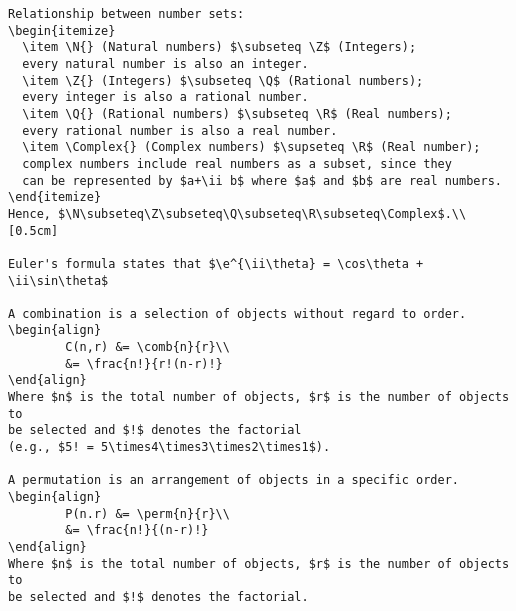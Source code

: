 \documentclass[a4paper,11pt,twoside]{article}
\begin{document}
\begin{verbatim}
Relationship between number sets:
\begin{itemize}
  \item \N{} (Natural numbers) $\subseteq \Z$ (Integers);
  every natural number is also an integer.
  \item \Z{} (Integers) $\subseteq \Q$ (Rational numbers);
  every integer is also a rational number.
  \item \Q{} (Rational numbers) $\subseteq \R$ (Real numbers);
  every rational number is also a real number.
  \item \Complex{} (Complex numbers) $\supseteq \R$ (Real number);
  complex numbers include real numbers as a subset, since they
  can be represented by $a+\ii b$ where $a$ and $b$ are real numbers.
\end{itemize}
Hence, $\N\subseteq\Z\subseteq\Q\subseteq\R\subseteq\Complex$.\\[0.5cm]

Euler's formula states that $\e^{\ii\theta} = \cos\theta + \ii\sin\theta$

A combination is a selection of objects without regard to order.
\begin{align}
      	C(n,r) &= \comb{n}{r}\\
      	&= \frac{n!}{r!(n-r)!}
\end{align}
Where $n$ is the total number of objects, $r$ is the number of objects to
be selected and $!$ denotes the factorial
(e.g., $5! = 5\times4\times3\times2\times1$).

A permutation is an arrangement of objects in a specific order.
\begin{align}
      	P(n.r) &= \perm{n}{r}\\
      	&= \frac{n!}{(n-r)!}
\end{align}
Where $n$ is the total number of objects, $r$ is the number of objects to
be selected and $!$ denotes the factorial.
\end{verbatim}
\end{document}
